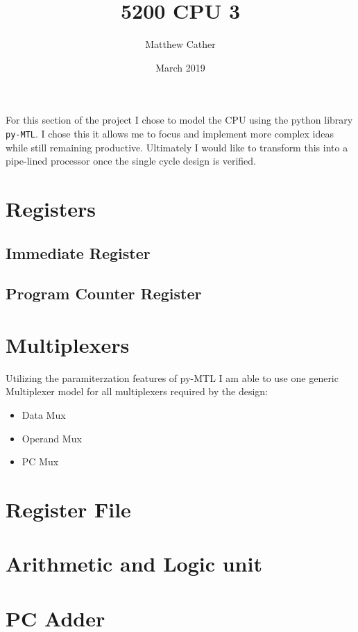 \documentclass{article}
\title{5200 CPU 3}
\author{Matthew Cather}
\date{March 2019}
\begin{document}
\maketitle

For this section of the project I chose to model the CPU using the python library \texttt{py-MTL}. I chose this it allows me to focus and implement more complex ideas while still remaining productive. Ultimately I would like to transform this into a pipe-lined processor once the single cycle design is verified. 

\tableofcontents
\clearpage

\section{Registers}
\subsection{Immediate Register}

\subsection{Program Counter Register}

\section{Multiplexers}
Utilizing the paramiterzation features of py-MTL I am able to use one generic Multiplexer model for all multiplexers required by the design:
\begin{itemize}
    \item Data Mux
    \item Operand Mux
    \item PC Mux
\end{itemize}


\section{Register File}


\section{Arithmetic and Logic unit}


\section{PC Adder}
\end{document}
